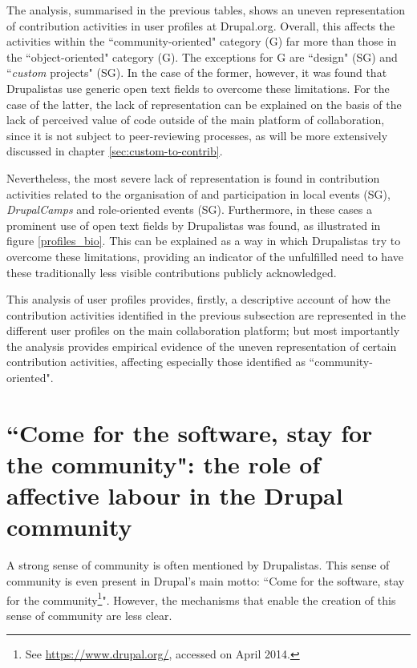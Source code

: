 
The analysis, summarised in the previous tables, shows an uneven representation of contribution activities in user profiles at Drupal.org. Overall, this affects the activities within the ``community-oriented" category (G) far more than those in the ``object-oriented" category (G). The exceptions for G are ``design" (SG) and ``\textit{custom} projects" (SG). In the case of the former, however, it was found that Drupalistas use generic open text fields to overcome these limitations. For the case of the latter, the lack of representation can be explained on the basis of the lack of perceived value of code outside of the main platform of collaboration, since it is not subject to peer-reviewing processes, as will be more extensively discussed in chapter \ref{sec:custom-to-contrib}.

Nevertheless, the most severe lack of representation is found in contribution activities related to the organisation of and participation in local events (SG), \textit{DrupalCamps} and role-oriented events (SG). Furthermore, in these cases a prominent use of open text fields by Drupalistas was found,  as illustrated in figure \ref{profiles_bio}. This can be explained as a way in which Drupalistas try to overcome these limitations, providing an indicator of the unfulfilled need to have these traditionally less visible contributions publicly acknowledged.

This analysis of user profiles provides, firstly, a descriptive account of how the contribution activities identified in the previous subsection are represented in the different user profiles on the main collaboration platform; but most importantly the analysis provides empirical evidence of the uneven representation of certain contribution activities, affecting especially those identified as ``community-oriented".

\section{``Come for the software, stay for the community": the role of affective labour in the Drupal community}
\label{subsec:insights:affective-labour}

A strong sense of community is often mentioned by Drupalistas. This sense of community is even present in Drupal's main motto: ``Come for the software, stay for the community\footnote{See \url{https://www.drupal.org/}, accessed on  April 2014.}". However, the mechanisms that enable the creation of this sense of community are less clear.

